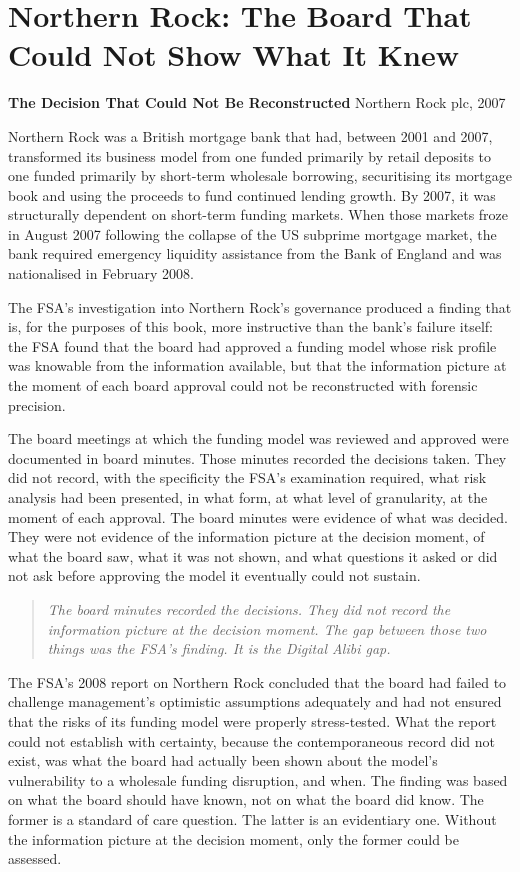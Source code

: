 \scenebreak

\section{Northern Rock: The Board That Could Not Show What It Knew}

\textbf{The Decision That Could Not Be Reconstructed} Northern Rock plc, 2007

Northern Rock was a British mortgage bank that had, between 2001 and 2007, transformed its business model from one funded primarily by retail deposits to one funded primarily by short-term wholesale borrowing, securitising its mortgage book and using the proceeds to fund continued lending growth. By 2007, it was structurally dependent on short-term funding markets. When those markets froze in August 2007 following the collapse of the US subprime mortgage market, the bank required emergency liquidity assistance from the Bank of England and was nationalised in February 2008.

The FSA's investigation into Northern Rock's governance produced a finding that is, for the purposes of this book, more instructive than the bank's failure itself: the FSA found that the board had approved a funding model whose risk profile was knowable from the information available, but that the information picture at the moment of each board approval could not be reconstructed with forensic precision.

The board meetings at which the funding model was reviewed and approved were documented in board minutes. Those minutes recorded the decisions taken. They did not record, with the specificity the FSA's examination required, what risk analysis had been presented, in what form, at what level of granularity, at the moment of each approval. The board minutes were evidence of what was decided. They were not evidence of the information picture at the decision moment, of what the board saw, what it was not shown, and what questions it asked or did not ask before approving the model it eventually could not sustain.

\begin{quote}
\emph{The board minutes recorded the decisions. They did not record the information picture at the decision moment. The gap between those two things was the FSA's finding. It is the Digital Alibi gap.}
\end{quote}

The FSA's 2008 report on Northern Rock concluded that the board had failed to challenge management's optimistic assumptions adequately and had not ensured that the risks of its funding model were properly stress-tested. What the report could not establish with certainty, because the contemporaneous record did not exist, was what the board had actually been shown about the model's vulnerability to a wholesale funding disruption, and when. The finding was based on what the board should have known, not on what the board did know. The former is a standard of care question. The latter is an evidentiary one. Without the information picture at the decision moment, only the former could be assessed.

